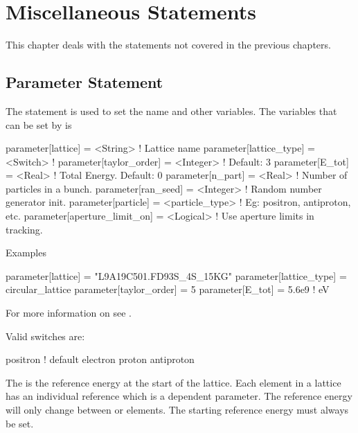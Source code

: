 \chapter{Miscellaneous Statements}

This chapter deals with the statements not covered in the previous chapters.

\section{Parameter Statement}
\label{s:param}


The  statement is used to set the  name and
other variables.  The variables that can be set by  is
\begin{example}
  parameter[lattice]      = <String>        ! Lattice name 
  parameter[lattice_type] = <Switch>        ! 
  parameter[taylor_order] = <Integer>       ! Default: 3
  parameter[E_tot]        = <Real>          ! Total Energy. Default: 0
  parameter[n_part]       = <Real>          ! Number of particles in a bunch.
  parameter[ran_seed]     = <Integer>       ! Random number generator init.
  parameter[particle]     = <particle_type> ! Eg: positron, antiproton, etc.
  parameter[aperture_limit_on] = <Logical>  ! Use aperture limits in tracking.
\end{example}

\noindent
Examples
\begin{example}
  parameter[lattice]      = "L9A19C501.FD93S_4S_15KG"
  parameter[lattice_type] = circular_lattice
  parameter[taylor_order] = 5
  parameter[E_tot]  = 5.6e9    ! eV
\end{example}

For more information on  see .

Valid  switches are:
\begin{example}
  positron  ! default
  electron
  proton
  antiproton
\end{example}

The  is the reference energy at the start of the
lattice.  Each element in a lattice has an individual reference
 which is a dependent parameter. 
The reference energy will only change between  or
 elements. The starting reference energy must always be set.

